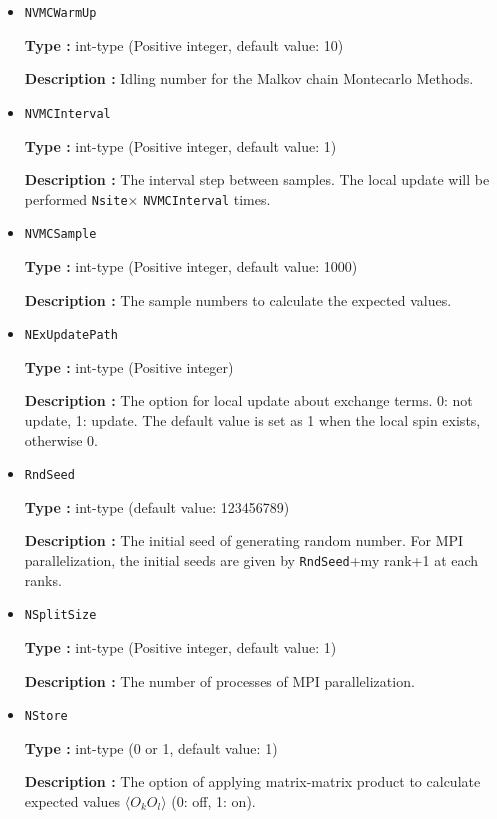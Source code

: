 \begin{itemize}
{\bf Description :} The time step using in the SR method. 
 
\item \verb|NVMCWarmUp|

{\bf Type :} int-type (Positive integer, default value: 10)

{\bf Description :} Idling number for the Malkov chain Montecarlo Methods.

\item \verb|NVMCInterval|

{\bf Type :} int-type (Positive integer, default value: 1)

{\bf Description :} The interval step between samples. The local update will be performed \verb|Nsite|× \verb|NVMCInterval| times.

\item \verb|NVMCSample|

{\bf Type :} int-type (Positive integer, default value: 1000)

{\bf Description :} The sample numbers to calculate the expected values.

\item \verb|NExUpdatePath|

{\bf Type :} int-type (Positive integer)

{\bf Description :}  The option for local update about exchange terms. 0: not update, 1: update. The default value is set as 1 when the local spin exists, otherwise 0.

\item \verb|RndSeed|

{\bf Type :} int-type (default value: 123456789)

{\bf Description :} The initial seed of generating random number. For MPI parallelization, the initial seeds are given by \verb|RndSeed|+my rank+1 at each ranks. 

 \item \verb|NSplitSize|

{\bf Type :} int-type (Positive integer, default value: 1)

{\bf Description :} The number of processes of MPI parallelization.

\item \verb|NStore|

{\bf Type :} int-type (0 or 1, default value: 1)

{\bf Description :} The option of applying matrix-matrix product to calculate expected values $\langle O_k O_l \rangle$ (0: off, 1: on).  
  

\end{itemize}
